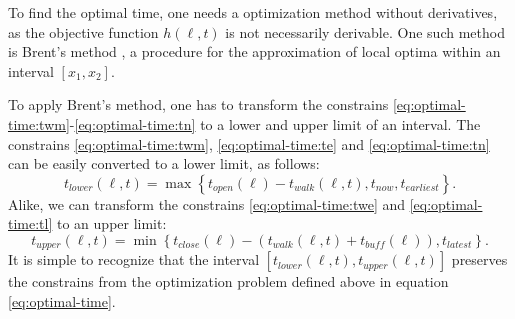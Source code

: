  To find the optimal time, one needs a optimization method without derivatives, as the objective function $h(\ell, t)$ is not necessarily derivable. One such method is Brent's method \parencite{Brent2002}, a procedure for the approximation of local optima within an interval $[x_1, x_2]$.
 
To apply Brent's method, one has to transform the constrains \eqref{eq:optimal-time:twm}-\eqref{eq:optimal-time:tn} to a lower and upper limit of an interval.  The constrains \eqref{eq:optimal-time:twm}, \eqref{eq:optimal-time:te} and \eqref{eq:optimal-time:tn} can  be easily converted to a lower limit, as follows: 
  	\begin{equation}\label{eq:lower-limit}
  		t_{lower}(\ell, t) = \max\left\lbrace  t_{open}(\ell)-t_{walk}(\ell, t), t_{now}, t_{earliest} \right\rbrace.
  	\end{equation}
  Alike, we can transform the constrains \eqref{eq:optimal-time:twe} and \eqref{eq:optimal-time:tl} to an upper limit:
  	\begin{equation}\label{eq:upper-limit}
  		t_{upper}(\ell, t) = \min\left\lbrace  t_{close}(\ell)- (t_{walk}(\ell, t) + t_{buff}(\ell)), t_{latest} \right\rbrace.
  	\end{equation}
 It is simple to recognize that the interval $[t_{lower}(\ell, t), t_{upper}(\ell, t)]$ preserves the constrains from the optimization problem defined above in equation \eqref{eq:optimal-time}.  
 
